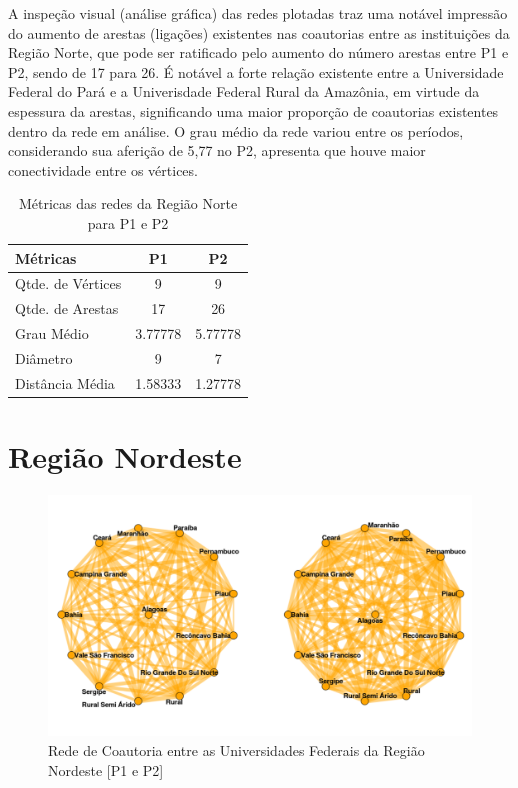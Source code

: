 \documentclass[12pt]{article}
\begin{document}
A inspeção visual (análise gráfica) das redes plotadas traz uma notável impressão do aumento de arestas (ligações) existentes nas coautorias entre as instituições da Região Norte, que pode ser ratificado pelo aumento do número arestas entre P1 e P2, sendo de 17 para 26. É notável a forte relação existente entre a Universidade Federal do Pará e a Univerisdade Federal Rural da Amazônia, em virtude da espessura da arestas, significando uma maior proporção de coautorias existentes dentro da rede em análise. O grau médio da rede variou entre os períodos, considerando sua aferição de 5,77 no P2, apresenta que houve maior conectividade entre os vértices.



\begin{table}[H]
\centering
\begin{tabular}{lS[table-format=3.5]S[table-format=3.5]}
\hline
{} 
\textbf{Métricas} & \textbf{P1} & \textbf{P2} \\ \hline
Qtde. de Vértices & 9     & 9           \\ \hline
Qtde. de Arestas  & 17     & 26          \\ \hline
Grau Médio        & 3.77778     & 5.77778     \\ \hline
Diâmetro          & 9     & 7           \\ \hline
Distância Média   & 1.58333     & 1.27778     \\ \hline
\end{tabular}
\caption{Métricas das redes da Região Norte para P1 e P2}
\end{table}

\section{Região Nordeste}

\begin{figure}[H]
\centering
\includegraphics[scale=0.6]{images/nordeste.pdf}
\caption{Rede de Coautoria entre as Universidades Federais da Região Nordeste [P1 e P2]}
\label{rede-nordeste}
\end{figure}
\end{document}
